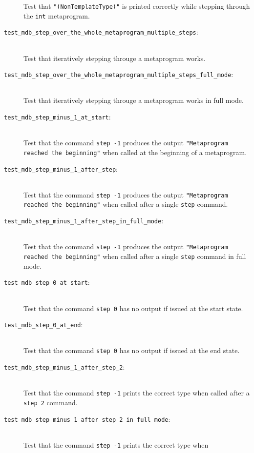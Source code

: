 \begin{description}
        Test that \texttt{"(NonTemplateType)"} is printed correctly while
        stepping through the \texttt{int} metaprogram.
    \item[\texttt{test\_mdb\_step\_over\_the\_whole\_metaprogram\_multiple\_steps}:] \hfill \\
        Test that iteratively stepping througe a metaprogram works.
    \item[\texttt{test\_mdb\_step\_over\_the\_whole\_metaprogram\_multiple\_steps\_full\_mode}:] \hfill \\
        Test that iteratively stepping througe a metaprogram works in full
        mode.
    \item[\texttt{test\_mdb\_step\_minus\_1\_at\_start}:] \hfill \\
        Test that the command \texttt{step -1} produces the output
        \texttt{"Metaprogram reached the beginning"} when called at the
        beginning of a metaprogram.
    \item[\texttt{test\_mdb\_step\_minus\_1\_after\_step}:] \hfill \\
        Test that the command \texttt{step -1} produces the output
        \texttt{"Metaprogram reached the beginning"} when called after a single
        \texttt{step} command.
    \item[\texttt{test\_mdb\_step\_minus\_1\_after\_step\_in\_full\_mode}:] \hfill \\
        Test that the command \texttt{step -1} produces the output
        \texttt{"Metaprogram reached the beginning"} when called after a single
        \texttt{step} command in full mode.
    \item[\texttt{test\_mdb\_step\_0\_at\_start}:] \hfill \\
        Test that the command \texttt{step 0} has no output if issued at the
        start state.
    \item[\texttt{test\_mdb\_step\_0\_at\_end}:] \hfill \\
        Test that the command \texttt{step 0} has no output if issued at the
        end state.
    \item[\texttt{test\_mdb\_step\_minus\_1\_after\_step\_2}:] \hfill \\
        Test that the command \texttt{step -1} prints the correct type when
        called after a \texttt{step 2} command.
    \item[\texttt{test\_mdb\_step\_minus\_1\_after\_step\_2\_in\_full\_mode}:] \hfill \\
        Test that the command \texttt{step -1} prints the correct type when

\end{description}
